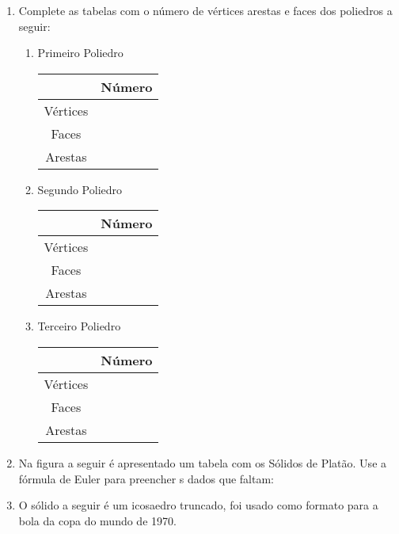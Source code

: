 \documentclass[oneside,a4paper,12pt]{article}
\begin{document}
\begin{enumerate}

\item Complete as tabelas com o número de vértices arestas e faces dos poliedros a seguir:
\begin{enumerate}
\item Primeiro Poliedro


{
\begin{tabular}{|c|c|}
\hline 
 & Número \\ 
\hline 
Vértices &  \\ 
\hline 
Faces &  \\ 
\hline 
Arestas &  \\ 
\hline 
\end{tabular} 
}

\item Segundo Poliedro


{
\begin{tabular}{|c|c|}
\hline 
 & Número \\ 
\hline 
Vértices &  \\ 
\hline 
Faces &  \\ 
\hline 
Arestas &  \\ 
\hline 
\end{tabular} 
}

\item Terceiro Poliedro


{
\begin{tabular}{|c|c|}
\hline 
 & Número \\ 
\hline 
Vértices &  \\ 
\hline 
Faces &  \\ 
\hline 
Arestas &  \\ 
\hline 
\end{tabular} 
}
\end{enumerate}

\item Na figura a seguir é apresentado um tabela com os Sólidos de Platão. Use a fórmula de Euler para preencher s dados que faltam:


\item O sólido a seguir é um icosaedro truncado, foi usado como formato para a bola da copa do mundo de 1970.



\end{enumerate}
\end{document}
